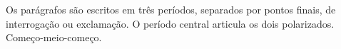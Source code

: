 Os parágrafos são escritos em três períodos, separados por pontos finais, de interrogação ou exclamação. O período central articula os dois polarizados. Começo-meio-começo.